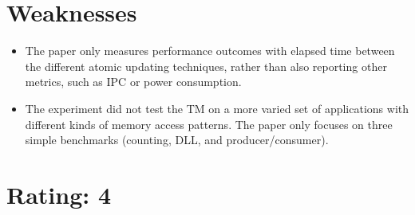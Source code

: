 \documentclass [12pt]{article}
\begin{document}
    \section{Weaknesses} %
    \label{sec:weaknesses}
        \begin{itemize}
            \item The paper only measures performance outcomes with elapsed time between the different atomic updating techniques, rather than also reporting other metrics, such as IPC or power consumption. 
            \item The experiment did not test the TM on a more varied set of applications with different kinds of memory access patterns. The paper only focuses on three simple benchmarks (counting, DLL, and producer/consumer).
        \end{itemize}

    \section{Rating: 4} %
    \label{sec:rating}
    \pagebreak
\end{document}
